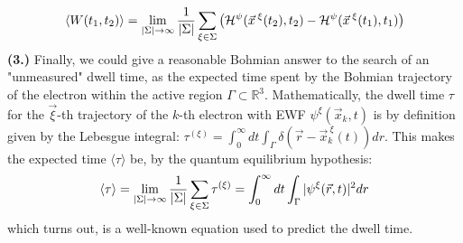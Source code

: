 \documentclass[11pt, a4paper]{article} %
\newcommand{\R}{\mathbb{R}} %
\newcommand{\B}{\mathfrak{B}}
\begin{document}
\begin{equation}
\langle W(t_1,t_2)\rangle = \lim_{|\Sigma|\rightarrow \infty}\frac{1}{|\Sigma|} \sum_{\xi\in\Sigma} \qty(\mathcal{H}^\psi(\vec{x}^{\:\xi}(t_2),t_2)-\mathcal{H}^\psi(\vec{x}^{\:\xi}(t_1),t_1))
\end{equation}
{\bf (3.) }Finally, we could give a reasonable Bohmian answer to the search of an "unmeasured" dwell time, as the expected time spent by the Bohmian trajectory of the electron within the active region $\Gamma\subset \R^3$. Mathematically, the dwell time $\tau$ for the $\vec{\xi}$-th trajectory of the $k$-th electron with EWF $\psi^\xi(\vec{x}_k,t)$ is by definition given by the Lebesgue integral: $\tau^{( \xi)}= \int_{0}^\infty  dt \int_\Gamma \delta(\vec{r}-\vec{x}_k^{\:\xi}(t)) dr$. This makes the expected time $\langle \tau\rangle$ be, by the quantum equilibrium hypothesis:\vspace{-0.15cm}
\begin{equation}
\langle \tau \rangle = \lim_{|\Sigma|\rightarrow \infty}\frac{1}{|\Sigma|} \sum_{\xi\in\Sigma} \tau^{(\xi)} = \int_{0}^\infty dt \int_\Gamma |\psi^\xi(\vec{r},t)|^2dr\vspace{-0.15cm}
\end{equation}
which turns out, is a well-known equation used to predict the dwell time.\vspace{-0.2cm}

\end{document}

